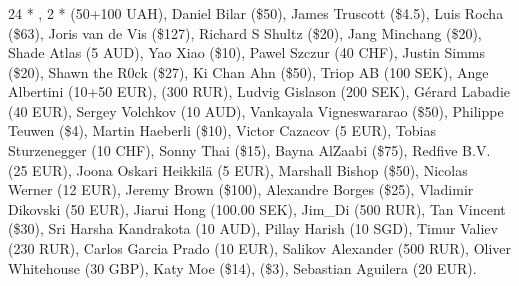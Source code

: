 \subsubsection*{}

24 * , 
2 *  (50+100 UAH), 
Daniel Bilar (\$50), 
James Truscott (\$4.5),
Luis Rocha (\$63), 
Joris van de Vis (\$127), 
Richard S Shultz (\$20), 
Jang Minchang (\$20), 
Shade Atlas (5 AUD), 
Yao Xiao (\$10),
Pawel Szczur (40 CHF), 
Justin Simms (\$20), 
Shawn the R0ck (\$27), 
Ki Chan Ahn (\$50), 
Triop AB (100 SEK), 
Ange Albertini (10+50 EUR),
 (300 RUR), 
Ludvig Gislason (200 SEK), 
Gérard Labadie (40 EUR), 
Sergey Volchkov (10 AUD),
Vankayala Vigneswararao (\$50),
Philippe Teuwen (\$4),
Martin Haeberli (\$10),
Victor Cazacov (5 EUR),
Tobias Sturzenegger (10 CHF),
Sonny Thai (\$15),
Bayna AlZaabi (\$75),
Redfive B.V. (25 EUR),
Joona Oskari Heikkilä (5 EUR),
Marshall Bishop (\$50),
Nicolas Werner (12 EUR),
Jeremy Brown (\$100),
Alexandre Borges (\$25),
Vladimir Dikovski (50 EUR),
Jiarui Hong (100.00 SEK),
Jim\_Di (500 RUR),
Tan Vincent (\$30),
Sri Harsha Kandrakota (10 AUD),
Pillay Harish (10 SGD),
Timur Valiev (230 RUR),
Carlos Garcia Prado (10 EUR),
Salikov Alexander (500 RUR),
Oliver Whitehouse (30 GBP),
Katy Moe (\$14),
 (\$3),
Sebastian Aguilera (20 EUR).
